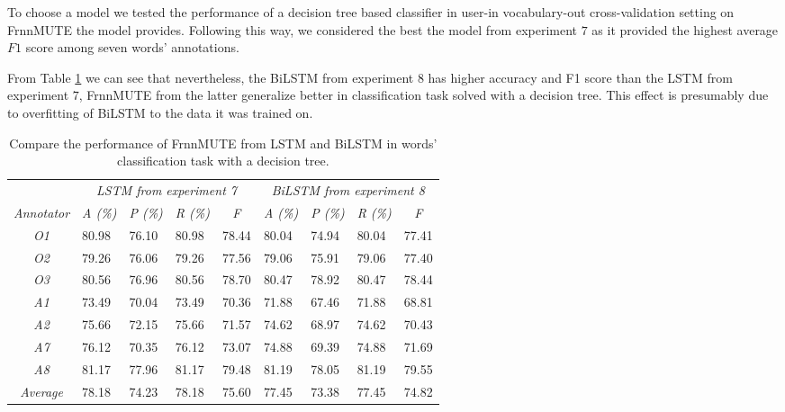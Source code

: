 To choose a model we tested the performance of a decision tree based classifier in user-in vocabulary-out cross-validation setting on FrnnMUTE the model provides. Following this way, we considered the best the model from experiment $7$ as it provided the highest average $F1$ score among seven words' annotations. 

From Table \ref{tab:compare-rnns} we can see that nevertheless, the BiLSTM from experiment $8$ has higher accuracy and F1 score than the LSTM from experiment $7$, FrnnMUTE from the latter generalize better in classification task solved with a decision tree. This effect is presumably due to overfitting of BiLSTM to the data it was trained on. 


\begin{table}[h]
\begin{tabular}{c|llll|llll}
\hline
\textit{} & \multicolumn{4}{c|}{\textit{LSTM from experiment 7}} & \multicolumn{4}{c}{\textit{BiLSTM from experiment 8}} \\ \cline{2-9} 
\textit{Annotator} & \multicolumn{1}{c}{\textit{A (\%)}} & \multicolumn{1}{c}{\textit{P  (\%)}} & \multicolumn{1}{c}{\textit{R  (\%)}} & \multicolumn{1}{c|}{\textit{F}} & \multicolumn{1}{c}{\textit{A (\%)}} & \multicolumn{1}{c}{\textit{P  (\%)}} & \multicolumn{1}{c}{\textit{R  (\%)}} & \multicolumn{1}{c}{\textit{F}} \\ \hline
\textit{O1} & 80.98 & 76.10 & 80.98 & 78.44 & 80.04 & 74.94 & 80.04 & 77.41 \\
\textit{O2} & 79.26 & 76.06 & 79.26 & 77.56 & 79.06 & 75.91 & 79.06 & 77.40 \\
\textit{O3} & 80.56 & 76.96 & 80.56 & 78.70 & 80.47 & 78.92 & 80.47 & 78.44 \\
\textit{A1} & 73.49 & 70.04 & 73.49 & 70.36 & 71.88 & 67.46 & 71.88 & 68.81 \\
\textit{A2} & 75.66 & 72.15 & 75.66 & 71.57 & 74.62 & 68.97 & 74.62 & 70.43 \\
\textit{A7} & 76.12 & 70.35 & 76.12 & 73.07 & 74.88 & 69.39 & 74.88 & 71.69 \\
\textit{A8} & 81.17 & 77.96 & 81.17 & 79.48 & 81.19 & 78.05 & 81.19 & 79.55 \\ \hline
\textit{Average} & 78.18 & 74.23 & 78.18 & 75.60 & 77.45 & 73.38 & 77.45 & 74.82 \\ \hline
\end{tabular}
  \caption{Compare the performance of FrnnMUTE from LSTM and BiLSTM in words' classification task with a decision tree.}
  \label{tab:compare-rnns}
\end{table}